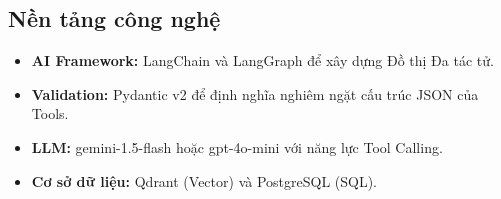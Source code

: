 \subsection{Nền tảng công nghệ}
\begin{itemize}
    \item \textbf{AI Framework:} LangChain và LangGraph để xây dựng Đồ thị Đa tác tử.
    \item \textbf{Validation:} Pydantic v2 để định nghĩa nghiêm ngặt cấu trúc JSON của Tools.
    \item \textbf{LLM:} gemini-1.5-flash hoặc gpt-4o-mini với năng lực Tool Calling.
    \item \textbf{Cơ sở dữ liệu:} Qdrant (Vector) và PostgreSQL (SQL).
\end{itemize}
